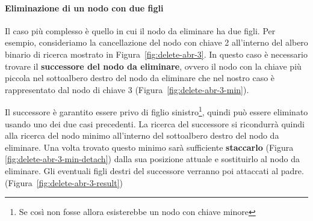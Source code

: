 \begin{center}
\begin{minipage}{.45\textwidth}
\centering

\label{fig:delete-abr-2}
\end{minipage}
\begin{minipage}{.45\textwidth}
\centering
{}
\label{fig:delete-abr-2-result}
\end{minipage}
\end{center}
\paragraph{Eliminazione di un nodo con due figli}
Il caso più complesso è quello in cui il nodo da eliminare ha due figli. Per esempio, consideriamo la cancellazione del nodo con chiave 2 all'interno del albero binario di ricerca mostrato in Figura~\ref{fig:delete-abr-3}. In questo caso è necessario trovare il \textbf{successore del nodo da eliminare}, ovvero il nodo con la chiave più piccola nel sottoalbero destro del nodo da eliminare che nel nostro caso è rappresentato dal nodo di chiave 3 (Figura~\ref{fig:delete-abr-3-min}).

Il successore è garantito essere privo di figlio sinistro\footnote{Se così non fosse allora esisterebbe un nodo con chiave minore}, quindi può essere eliminato usando uno dei due casi precedenti. La ricerca del successore si ricondurrà quindi alla ricerca del nodo minimo all'interno del sottoalbero destro del nodo da eliminare. Una volta trovato questo minimo sarà sufficiente \textbf{staccarlo} (Figura \ref{fig:delete-abr-3-min-detach}) dalla sua posizione attuale e sostituirlo al nodo da eliminare. Gli eventuali figli destri del successore verranno poi attaccati al padre. (Figura~\ref{fig:delete-abr-3-result})

